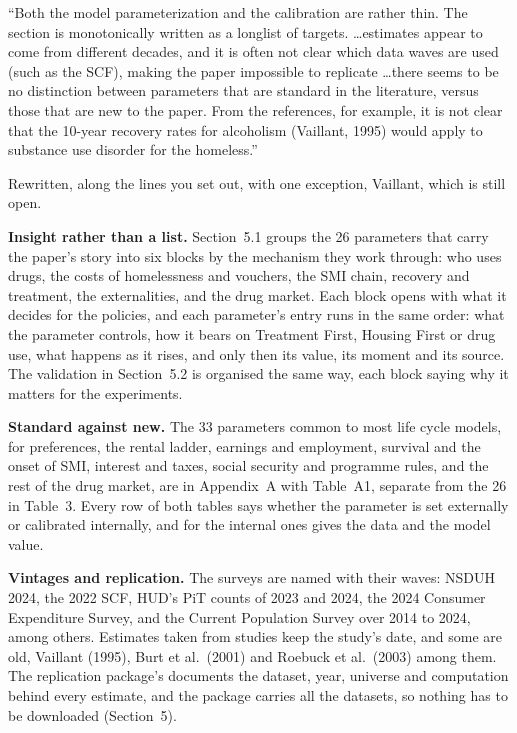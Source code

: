 \documentclass[11pt]{article}
\begin{document}
\begin{referee}
``Both the model parameterization and the calibration are rather thin. The
section is monotonically written as a longlist of targets. \dots estimates appear
to come from different decades, and it is often not clear which data waves are
used (such as the SCF), making the paper impossible to replicate \dots there
seems to be no distinction between parameters that are standard in the literature,
versus those that are new to the paper. From the references, for example, it is
not clear that the 10-year recovery rates for alcoholism (Vaillant, 1995) would
apply to substance use disorder for the homeless.''
\end{referee}
\begin{response}
Rewritten, along the lines you set out, with one exception, Vaillant, which is
still open.

\textbf{Insight rather than a list.} Section~5.1 groups the 26 parameters that carry
the paper's story into six blocks by the mechanism they work through: who uses
drugs, the costs of homelessness and vouchers, the SMI chain, recovery and
treatment, the externalities, and the drug market. Each block opens with what it
decides for the policies, and each parameter's entry runs in the same order: what
the parameter controls, how it bears on Treatment First, Housing First or drug use,
what happens as it rises, and only then its value, its moment and its source. The
validation in Section~5.2 is organised the same way, each block saying why it
matters for the experiments.

\textbf{Standard against new.} The 33 parameters common to most life cycle models,
for preferences, the rental ladder, earnings and employment, survival and the onset
of SMI, interest and taxes, social security and programme rules, and the rest of the
drug market, are in Appendix~A with Table~A1, separate from the 26 in Table~3.
Every row of both tables says whether the parameter is set externally or calibrated
internally, and for the internal ones gives the data and the model value.

\textbf{Vintages and replication.} The surveys are named with their waves: NSDUH
2024, the 2022 SCF, HUD's PiT counts of 2023 and 2024, the 2024 Consumer
Expenditure Survey, and the Current Population Survey over 2014 to 2024, among
others. Estimates taken from studies keep the study's date, and some are old,
Vaillant (1995), Burt et al.\ (2001) and Roebuck et al.\ (2003) among them. The
replication package's  documents the dataset, year,
universe and computation behind every estimate, and the package carries all the
datasets, so nothing has to be downloaded (Section~5).


\end{response}
\end{document}
